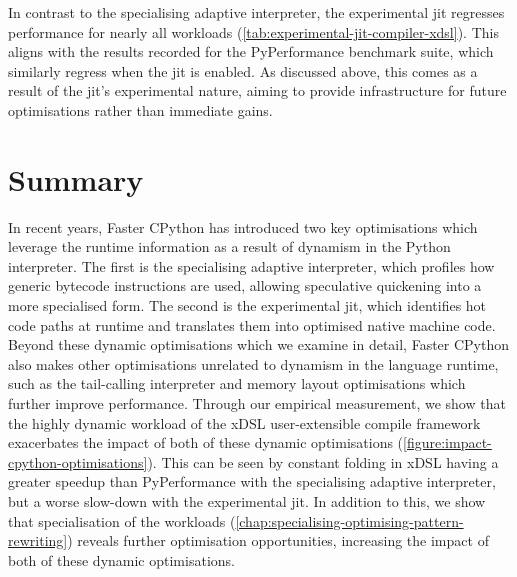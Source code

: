 In contrast to the specialising adaptive interpreter, the experimental \ac{jit} regresses performance for nearly all workloads (\autoref{tab:experimental-jit-compiler-xdsl}).
This aligns with the results recorded for the PyPerformance benchmark suite, which similarly regress when the \ac{jit} is enabled.
As discussed above, this comes as a result of the \ac{jit}'s experimental nature, aiming to provide infrastructure for future optimisations rather than immediate gains.



\section{Summary}
\label{chap:impact-cpython-pattern-summary}

In recent years, Faster CPython has introduced two key optimisations which leverage the runtime information as a result of dynamism in the Python interpreter.
The first is the specialising adaptive interpreter, which profiles how generic bytecode instructions are used, allowing speculative quickening into a more specialised form. The second is the experimental \ac{jit}, which identifies hot code paths at runtime and translates them into optimised native machine code.
Beyond these dynamic optimisations which we examine in detail, Faster CPython also makes other optimisations unrelated to dynamism in the language runtime, such as the tail-calling interpreter \cite{joshhabermanTailCallingInterpreter2025} and memory layout optimisations which further improve performance.
Through our empirical measurement, we show that the highly dynamic workload of the xDSL user-extensible compile framework exacerbates the impact of both of these dynamic optimisations (\autoref{figure:impact-cpython-optimisations}). This can be seen by constant folding in xDSL having a greater speedup than PyPerformance with the specialising adaptive interpreter, but a worse slow-down with the experimental \ac{jit}.
In addition to this, we show that specialisation of the workloads (\autoref{chap:specialising-optimising-pattern-rewriting}) reveals further optimisation opportunities, increasing the impact of both of these dynamic optimisations.

